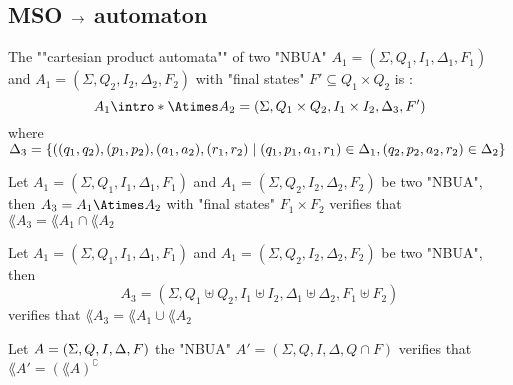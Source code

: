 \documentclass{article}
\begin{document}
\subsection{MSO $\rightarrow$ automaton}

\begin{definition}
	The ""cartesian product automata"" of two "NBUA" $A_1 = (\Sigma, Q_1, I_1, \Delta_1, F_1)$ and $A_1 = (\Sigma, Q_2, I_2, \Delta_2, F_2)$ with "final states" $F' \subseteq Q_1 \times Q_2$ is :
	\[ A_1 \intro* \Atimes A_2 = (\Sigma, Q_1 \times Q_2, I_1 \times I_2, \Delta_3 , F') \]
	where $\Delta_3 = \left\{((q_1,q_2) , (p_1,p_2), (a_1,a_2), (r_1,r_2) \mid  (q_1,p_1,a_1,r_1) \in \Delta_1, (q_2,p_2,a_2,r_2) \in \Delta_2\right\}$
\end{definition}

\begin{lemma}
	Let $A_1 = (\Sigma, Q_1, I_1, \Delta_1, F_1)$ and $A_1 = (\Sigma, Q_2, I_2, \Delta_2, F_2)$ be two "NBUA", then $A_3 = A_1 \Atimes A_2$ with "final states" $F_1 \times F_2$
	verifies that $\lang {A_3} = \lang {A_1} \cap \lang {A_2}$
\end{lemma}

\begin{lemma}
	Let $A_1 = (\Sigma, Q_1, I_1, \Delta_1, F_1)$ and $A_1 = (\Sigma, Q_2, I_2, \Delta_2, F_2)$ be two "NBUA", then
	\[ A_3 = (\Sigma, Q_1 \uplus Q_2, I_1 \uplus I_2, \Delta_1 \uplus \Delta_2, F_1 \uplus F_2) \]
	verifies that $\lang {A_3} = \lang {A_1} \cup \lang {A_2}$
\end{lemma}

\begin{lemma}
	Let $A = (\Sigma, Q, I, \Delta, F)$ the "NBUA" $A' = (\Sigma, Q, I, \Delta, Q \cap F)$
	verifies that $\lang {A'} = (\lang A )^{\complement}$
\end{lemma}
\end{document}
